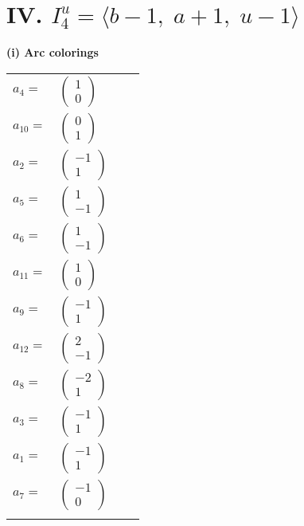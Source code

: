 \documentclass[1p]{elsarticle_modified}
\theoremstyle{definition}
\begin{document}
\centering \section*{IV. $I^u_{4}= \langle b-1,\;a+1,\;u-1 \rangle$}
\flushleft \textbf{(i) Arc colorings}\\
\begin{tabular}{m{7pt} m{180pt} m{7pt} m{180pt} }
\flushright $a_{4}=$&$\begin{pmatrix}1\\0\end{pmatrix}$ \\
\flushright $a_{10}=$&$\begin{pmatrix}0\\1\end{pmatrix}$ \\
\flushright $a_{2}=$&$\begin{pmatrix}-1\\1\end{pmatrix}$ \\
\flushright $a_{5}=$&$\begin{pmatrix}1\\-1\end{pmatrix}$ \\
\flushright $a_{6}=$&$\begin{pmatrix}1\\-1\end{pmatrix}$ \\
\flushright $a_{11}=$&$\begin{pmatrix}1\\0\end{pmatrix}$ \\
\flushright $a_{9}=$&$\begin{pmatrix}-1\\1\end{pmatrix}$ \\
\flushright $a_{12}=$&$\begin{pmatrix}2\\-1\end{pmatrix}$ \\
\flushright $a_{8}=$&$\begin{pmatrix}-2\\1\end{pmatrix}$ \\
\flushright $a_{3}=$&$\begin{pmatrix}-1\\1\end{pmatrix}$ \\
\flushright $a_{1}=$&$\begin{pmatrix}-1\\1\end{pmatrix}$ \\
\flushright $a_{7}=$&$\begin{pmatrix}-1\\0\end{pmatrix}$\\&\end{tabular}
\end{document}
